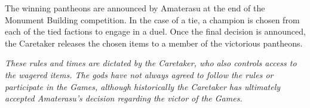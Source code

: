 \documentclass[green]{guardians}
\begin{document}
The winning pantheons are announced by Amaterasu at the end of the Monument Building competition. In the case of a tie, a champion is chosen from each of the tied factions to engage in a duel. Once the final decision is announced, the Caretaker releases the chosen items to a member of the victorious pantheons.

\emph{These rules and times are dictated by the Caretaker, who also controls access to the wagered items. The gods have not always agreed to follow the rules or participate in the Games, although historically the Caretaker has ultimately accepted Amaterasu's decision regarding the victor of the Games.}
\end{document}
